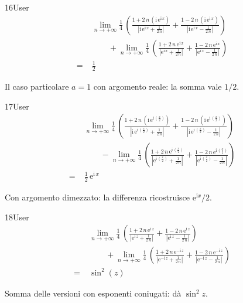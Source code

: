 \begin{espr}{16}{User}{}
\begin{align*}
& \lim_{n \to +\infty} \frac{1}{4}\, \left(\frac{1 + 2\, n\, \left(\mathrm{i}\, \mathrm{e}^{\mathrm{i}\, x}\right)}{\left|\mathrm{i}\, \mathrm{e}^{\mathrm{i}\, x} + \frac{1}{2\, n}\right|} + \frac{1 - 2\, n\, \left(\mathrm{i}\, \mathrm{e}^{\mathrm{i}\, x}\right)}{\left|\mathrm{i}\, \mathrm{e}^{\mathrm{i}\, x} - \frac{1}{2\, n}\right|}\right) \\
&\qquad + \lim_{n \to +\infty} \frac{1}{4}\, \left(\frac{1 + 2\, n\, \mathrm{e}^{\mathrm{i}\, x}}{\left|\mathrm{e}^{\mathrm{i}\, x} + \frac{1}{2\, n}\right|} + \frac{1 - 2\, n\, \mathrm{e}^{\mathrm{i}\, x}}{\left|\mathrm{e}^{\mathrm{i}\, x} - \frac{1}{2\, n}\right|}\right) \\
=\;& \frac{1}{2}
\end{align*}
\end{espr}
Il caso particolare $a=1$ con argomento reale: la somma vale $1/2$.

\begin{espr}{17}{User}{}
\begin{align*}
& \lim_{n \to +\infty} \frac{1}{4}\, \left(\frac{1 + 2\, n\, \left(\mathrm{i}\, \mathrm{e}^{\mathrm{i}\, \left(\frac{x}{2}\right)}\right)}{\left|\mathrm{i}\, \mathrm{e}^{\mathrm{i}\, \left(\frac{x}{2}\right)} + \frac{1}{2\, n}\right|} + \frac{1 - 2\, n\, \left(\mathrm{i}\, \mathrm{e}^{\mathrm{i}\, \left(\frac{x}{2}\right)}\right)}{\left|\mathrm{i}\, \mathrm{e}^{\mathrm{i}\, \left(\frac{x}{2}\right)} - \frac{1}{2\, n}\right|}\right) \\
&\qquad - \lim_{n \to +\infty} \frac{1}{4}\, \left(\frac{1 + 2\, n\, \mathrm{e}^{\mathrm{i}\, \left(\frac{x}{2}\right)}}{\left|\mathrm{e}^{\mathrm{i}\, \left(\frac{x}{2}\right)} + \frac{1}{2\, n}\right|} + \frac{1 - 2\, n\, \mathrm{e}^{\mathrm{i}\, \left(\frac{x}{2}\right)}}{\left|\mathrm{e}^{\mathrm{i}\, \left(\frac{x}{2}\right)} - \frac{1}{2\, n}\right|}\right) \\
=\;& \frac{1}{2}\, \mathrm{e}^{\mathrm{i}\, x}
\end{align*}
\end{espr}
Con argomento dimezzato: la differenza ricostruisce $\mathrm{e}^{\mathrm{i}x}/2$.

\begin{espr}{18}{User}{}
\begin{align*}
& \lim_{n \to +\infty} \frac{1}{4}\, \left(\frac{1 + 2\, n\, \mathrm{e}^{\mathrm{i}\, z}}{\left|\mathrm{e}^{\mathrm{i}\, z} + \frac{1}{2\, n}\right|} + \frac{1 - 2\, n\, \mathrm{e}^{\mathrm{i}\, z}}{\left|\mathrm{e}^{\mathrm{i}\, z} - \frac{1}{2\, n}\right|}\right) \\
&\qquad + \lim_{n \to +\infty} \frac{1}{4}\, \left(\frac{1 + 2\, n\, \mathrm{e}^{-\mathrm{i}\, z}}{\left|\mathrm{e}^{-\mathrm{i}\, z} + \frac{1}{2\, n}\right|} + \frac{1 - 2\, n\, \mathrm{e}^{-\mathrm{i}\, z}}{\left|\mathrm{e}^{-\mathrm{i}\, z} - \frac{1}{2\, n}\right|}\right) \\
=\;& \sin^{2}\!\left(z\right)
\end{align*}
\end{espr}
Somma delle versioni con esponenti coniugati: dà $\sin^2 z$.


